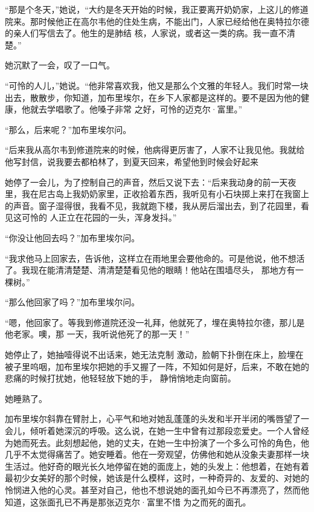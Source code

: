 \documentclass{article}
\begin{document}
“那是个冬天，”她说，“大约是冬天开始的时候，我正要离开奶奶家，上这儿的修道院来。那时候他正在高尔韦他的住处生病，不能出门，人家已经给他在奥特拉尔德的亲人们写信去了。他生的是肺结
核，人家说，或者这一类的病。我一直不清楚。” 


她沉默了一会，叹了一口气。 

“可怜的人儿，”她说。“他非常喜欢我，他又是那么个文雅的年轻人。我们时常一块出去，散散步，你知道，加布里埃尔，在乡下人家都是这样的。要不是因为他的健康，他就去学唱歌了。他嗓子非常
之好，可怜的迈克尔·富里。” 


“那么，后来呢？”加布里埃尔问。 

“后来我从高尔韦到修道院来的时候，他病得更厉害了，人家不让我见他。我就给他写封信，说我要去都柏林了，到夏天回来，希望他到时候会好起来

\newpage

她停了一会儿，为了控制自己的声音，然后又说下去：“后来我动身的前一天夜里，我在尼古岛上我奶奶家里，正收拾着东西，我听见有小石块掷上来打在我窗上的声音。窗子湿得很，我看不见，我就跑下楼，我从房后溜出去，到了花园里，看见这可怜的
人正立在花园的一头，浑身发抖。” 


“你没让他回去吗？”加布里埃尔问。 

“我求他马上回家去，告诉他，这样立在雨地里会要他命的。可是他说，他不想活了。我现在能清清楚楚、清清楚楚看见他的眼睛！他站在围墙尽头，
那地方有一棵树。” 


“那么他回家了吗？”加布里埃尔问。 

“嗯，他回家了。等我到修道院还没一礼拜，他就死了，埋在奥特拉尔德，那儿是他老家。噢，那
一天，我听说他死了的那一天！” 

她停止了，她抽噎得说不出话来，她无法克制
\newpage
激动，脸朝下扑倒在床上，脸埋在被子里呜咽，加布里埃尔把她的手又握了一阵，不知如何是好，后来，不敢在她的悲痛的时候打扰她，他轻轻放下她的手，
静悄悄地走向窗前。 


她睡熟了。 

加布里埃尔斜靠在臂肘上，心平气和地对她乱蓬蓬的头发和半开半闭的嘴唇望了一会儿，倾听着她深沉的呼吸。这么说，在她一生中曾有过那段恋爱史。一个人曾经为她而死去。此刻想起他，她的丈夫，在她一生中扮演了一个多么可怜的角色，他几乎不太觉得痛苦了。她安睡着。他在一旁观望，仿佛他和她从没象夫妻那样一块生活过。他好奇的眼光长久地停留在她的面庞上，她的头发上：他想着，在她有着最初少女美好的那个时候，她该是什么模样，这时，一种奇异的、友爱的、对她的怜悯进入他的心灵。甚至对自己，他也不想说她的面孔如今已不再漂亮了，然而他知道，这张面孔已不再是那张迈克尔·富里不惜
为之而死的面孔。 

\newpage
\end{document}
